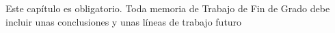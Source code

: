 

Este capítulo es obligatorio.
Toda memoria de Trabajo de Fin de Grado debe incluir unas conclusiones y unas 
líneas de trabajo futuro 

